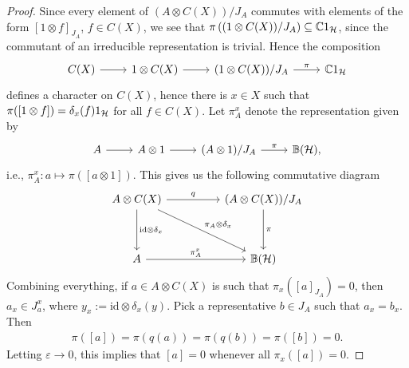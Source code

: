 \begin{proof}
	Since every element of $(A \otimes C(X))/J_A$ commutes with elements of the form $[1 \otimes f]_{J_A}$, $f \in C(X)$, we see that $\pi\left( (1 \otimes C(X))/J_A \right) \subseteq \mathbb{C} 1_{\mathcal{H}}$, since the commutant of an irreducible representation is trivial. Hence the composition
	\begin{equation*}
		\begin{tikzcd}
			 C(X) \ar[r] & 1 \otimes C(X) \ar[r] & (1 \otimes C(X))/J_A \ar[r, "\pi"] & \C 1_\H 
		\end{tikzcd}
	\end{equation*}
	defines a character on $C(X)$, hence there is $x \in X$ such that $\pi([1 \otimes f]) = \delta_x(f)1_{\mathcal{H}}$ for all $f \in C(X)$. Let $\pi_A^x$ denote the representation given by 
	\begin{equation*}
		\begin{tikzcd}
			A \ar[r] &A \otimes 1  \ar[r] & (A \otimes 1)/J_A \ar[r, "\pi"] & \mathbb{B}(\H),
		\end{tikzcd}
	\end{equation*}
	i.e., $\pi_A^x \colon a \mapsto \pi([a \otimes 1])$. This gives us the following commutative diagram
	\begin{equation*}
		\begin{tikzcd}
			A \otimes C(X) \ar[rr, "q"] \ar [dd, "\mathrm{id}\otimes \delta_x"] \ar[rrdd, "\pi_A \otimes \delta_x"] && (A \otimes C(X))/J_A \ar[dd, "\pi"]\\ 
			 & & \\
			A \ar[rr, "\pi_A^x"] && \mathbb{B}(\H)
		\end{tikzcd}
	\end{equation*}
	Combining everything, if $a \in A \otimes C(X)$ is such that $\pi_x([a]_{J_A})=0$, then $a_x \in J_a^x$, where $y_x := \mathrm{id} \otimes \delta_x (y)$. Pick a representative $b \in J_A$ such that $a_x = b_x$. Then
	\begin{align*}
		\pi([a]) = \pi( q(a)) =  \pi(q(b)) = \pi([b])=0.
	\end{align*}
	Letting $\varepsilon \to 0$, this implies that $[a] = 0$ whenever all $\pi_x([a]) = 0$. 
	

\end{proof}
